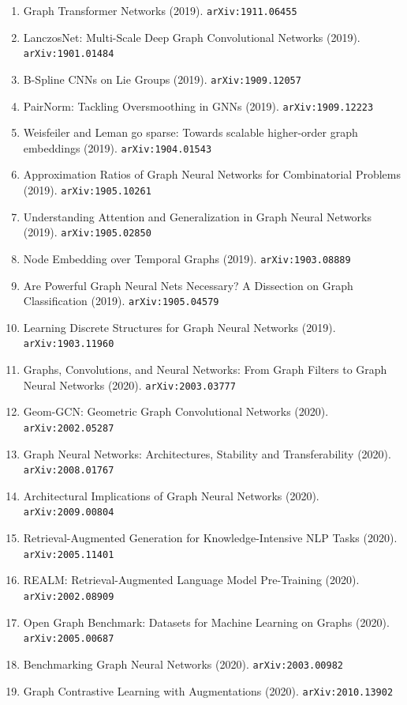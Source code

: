 \documentclass[11pt]{article}
\begin{document}
\begin{enumerate}
  \item Graph Transformer Networks (2019). \texttt{arXiv:1911.06455}
  \item LanczosNet: Multi-Scale Deep Graph Convolutional Networks (2019). \texttt{arXiv:1901.01484}
  \item B-Spline CNNs on Lie Groups (2019). \texttt{arXiv:1909.12057}
  \item PairNorm: Tackling Oversmoothing in GNNs (2019). \texttt{arXiv:1909.12223}
  \item Weisfeiler and Leman go sparse: Towards scalable higher-order graph
  embeddings (2019). \texttt{arXiv:1904.01543}
  \item Approximation Ratios of Graph Neural Networks for Combinatorial Problems (2019). \texttt{arXiv:1905.10261}
  \item Understanding Attention and Generalization in Graph Neural Networks (2019). \texttt{arXiv:1905.02850}
  \item Node Embedding over Temporal Graphs (2019). \texttt{arXiv:1903.08889}
  \item Are Powerful Graph Neural Nets Necessary? A Dissection on Graph
  Classification (2019). \texttt{arXiv:1905.04579}
  \item Learning Discrete Structures for Graph Neural Networks (2019). \texttt{arXiv:1903.11960}
  \item Graphs, Convolutions, and Neural Networks: From Graph Filters to Graph
  Neural Networks (2020). \texttt{arXiv:2003.03777}
  \item Geom-GCN: Geometric Graph Convolutional Networks (2020). \texttt{arXiv:2002.05287}
  \item Graph Neural Networks: Architectures, Stability and Transferability (2020). \texttt{arXiv:2008.01767}
  \item Architectural Implications of Graph Neural Networks (2020). \texttt{arXiv:2009.00804}
  \item Retrieval-Augmented Generation for Knowledge-Intensive NLP Tasks (2020). \texttt{arXiv:2005.11401}
  \item REALM: Retrieval-Augmented Language Model Pre-Training (2020). \texttt{arXiv:2002.08909}
  \item Open Graph Benchmark: Datasets for Machine Learning on Graphs (2020). \texttt{arXiv:2005.00687}
  \item Benchmarking Graph Neural Networks (2020). \texttt{arXiv:2003.00982}
  \item Graph Contrastive Learning with Augmentations (2020). \texttt{arXiv:2010.13902}

\end{enumerate}
\end{document}

